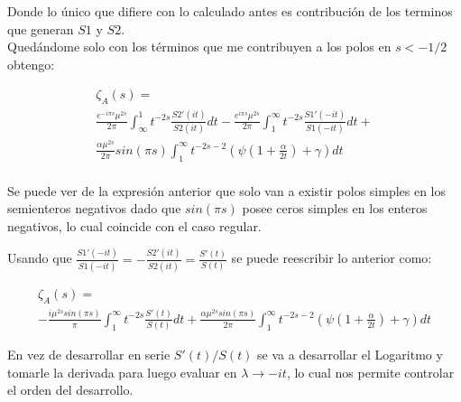 Donde lo único que difiere con lo calculado antes es contribución de los terminos que generan $S1$ y $S2$. \\




Quedándome solo con los términos que me contribuyen a los polos en  $s < -1/2$ obtengo:

\begin{equation}
\begin{array}{c}
 \zeta _A (s) = \\ [10pt]
\frac{e ^{- i \pi s} \mu ^{2s } }{2 \pi}
\int _{\infty} ^{1} t ^{-2s } 
		\frac{S2' (it)}{S2 (it)}
		d t
	- 
\frac{e ^{i \pi s} \mu ^{2s}}{2 \pi}
\int _{1} ^{\infty} t ^{-2s } 
	\frac{S1' (-it)}{S1(-it)}
	d t +
	 \\ [10pt]
	\frac{\alpha \mu ^{2s} }{2 \pi }	sin( \pi s)  \int _1 ^{\infty}
	t ^{-2s-2} \left( \psi \left( 1 + \frac{\alpha}{2 t}\right) + \gamma \right) dt \\[15pt]


\end{array}
\end{equation}




Se puede ver de la expresión anterior que solo van a existir polos simples en los semienteros negativos dado que $sin(\pi s)$ posee ceros simples en los enteros negativos, lo cual coincide con el caso regular.

Usando que $\frac{S1' (-it)}{S1 (-i t)} = - \frac{S2 ' (i t)}{S2(it)} = \frac{S'(t)}{S(t)}  $ se puede reescribir lo anterior como:

\begin{equation}
\begin{array}{c}
\zeta _A (s) =  \\ [5pt]
-  \frac{i \mu ^{2s}  sin (\pi s)}{\pi} \int _1 ^{\infty} t ^{-2s} \frac{S'(t)}{S(t)} dt + 
\frac{\alpha \mu ^{2s} sin( \pi s )}{2 \pi } \int _{1} ^{\infty} 
t ^{-2s-2} \left( \psi (1 + \frac{\alpha}{2 t}) + \gamma \right) dt
\end{array}
\end{equation}



En vez de desarrollar en serie $S'(t) / S (t)$ se va a desarrollar el Logaritmo y tomarle la derivada para luego evaluar en $\lambda \rightarrow -i t$, lo cual nos permite controlar el orden del desarrollo.

